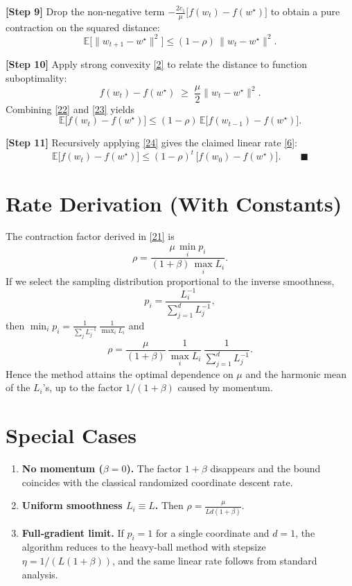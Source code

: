 \documentclass{article}
\newcommand{\E}{\mathbb{E}}
\begin{document}
\medskip
\noindent\textbf{[Step 9]}  Drop the non‑negative term $-\frac{2c_1}{\mu}\bigl[f(w_t)-f(w^{\star})\bigr]$ to obtain a pure contraction on the squared distance:
\[
\E\!\bigl[\|w_{t+1}-w^{\star}\|^{2}\bigr]
\le (1-\rho)\,\|w_t-w^{\star}\|^{2}. \tag{22}
\]

\medskip
\noindent\textbf{[Step 10]}  Apply strong convexity \eqref{2} to relate the distance to function suboptimality:
\[
f(w_t)-f(w^{\star})\;\ge\;\frac{\mu}{2}\|w_t-w^{\star}\|^{2}.
\tag{23}
\]
Combining \eqref{22} and \eqref{23} yields
\[
\E\!\bigl[f(w_t)-f(w^{\star})\bigr]
\le (1-\rho)\,\E\!\bigl[f(w_{t-1})-f(w^{\star})\bigr].
\tag{24}
\]

\medskip
\noindent\textbf{[Step 11]}  Recursively applying \eqref{24} gives the claimed linear rate \eqref{6}:
\[
\E\!\bigl[f(w_t)-f(w^{\star})\bigr]
\le (1-\rho)^{t}\,\bigl[f(w_0)-f(w^{\star})\bigr].
\qquad\blacksquare
\]

\section*{Rate Derivation (With Constants)}
The contraction factor derived in \eqref{21} is
\[
\rho = \frac{\mu\,\min_i p_i}{(1+\beta)\,\max_i L_i}.
\]
If we select the sampling distribution proportional to the inverse smoothness,
\[
p_i = \frac{L_i^{-1}}{\sum_{j=1}^{d}L_j^{-1}},
\tag{25}
\]
then $\min_i p_i = \frac{1}{\sum_j L_j^{-1}}\,\frac{1}{\max_i L_i}$ and
\[
\rho = \frac{\mu}{(1+\beta)}\,
\frac{1}{\max_i L_i}\,
\frac{1}{\sum_{j=1}^{d}L_j^{-1}}.
\]
Hence the method attains the optimal dependence on $\mu$ and the harmonic mean of the $L_i$'s, up to the factor $1/(1+\beta)$ caused by momentum.

\section*{Special Cases}
\begin{enumerate}
\item \textbf{No momentum ($\beta=0$).} The factor $1+\beta$ disappears and the bound coincides with the classical randomized coordinate descent rate.
\item \textbf{Uniform smoothness $L_i\equiv L$.} Then $\rho=\frac{\mu}{L d(1+\beta)}$.
\item \textbf{Full‑gradient limit.} If $p_i=1$ for a single coordinate and $d=1$, the algorithm reduces to the heavy‑ball method with stepsize $\eta=1/(L(1+\beta))$, and the same linear rate follows from standard analysis.
\end{enumerate}
\end{document}

